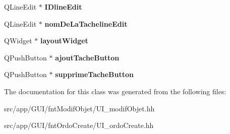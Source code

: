 \begin{DoxyCompactItemize}
Q\+Line\+Edit $\ast$ {\bfseries I\+Dline\+Edit}
\item 
\mbox{\label{classUi__Dialog_a1139ee174cba33911163e41ac195ddf1}} 
Q\+Line\+Edit $\ast$ {\bfseries nom\+De\+La\+Tacheline\+Edit}
\item 
\mbox{\label{classUi__Dialog_aeb2e76ae84a3a2c7943003b31fab3807}} 
Q\+Widget $\ast$ {\bfseries layout\+Widget}
\item 
\mbox{\label{classUi__Dialog_a27c192da4543c54249812fb9f71527b7}} 
Q\+Push\+Button $\ast$ {\bfseries ajout\+Tache\+Button}
\item 
\mbox{\label{classUi__Dialog_a7cf0729e86084e67c47b3494718c2af0}} 
Q\+Push\+Button $\ast$ {\bfseries supprime\+Tache\+Button}
\end{DoxyCompactItemize}


The documentation for this class was generated from the following files\+:\begin{DoxyCompactItemize}
\item 
src/app/\+G\+U\+I/fnt\+Modif\+Objet/U\+I\+\_\+modif\+Objet.\+hh\item 
src/app/\+G\+U\+I/fnt\+Ordo\+Create/U\+I\+\_\+ordo\+Create.\+hh\end{DoxyCompactItemize}
